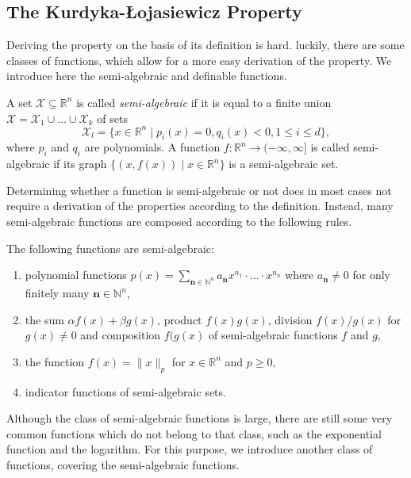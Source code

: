 \subsection{The Kurdyka-{\L}ojasiewicz Property}
Deriving the \KL property on the basis of its definition is hard. luckily, there are some classes of functions, which allow for a more easy derivation of the \KL property. We introduce here the semi-algebraic and definable functions. 
\begin{definition}
A set $\mathcal{X}\subseteq \mathbb{R}^n$ is called \emph{semi-algebraic} if it is equal to a finite union $\mathcal{X}=\mathcal{X}_1\cup\ldots\cup\mathcal{X}_k$ of sets
\[\mathcal{X}_l=\{x\in\mathbb{R}^n\mid p_i(x)=0, q_i(x)<0, 1\leq i\leq d\},\]
where $p_i$ and $q_i$ are polynomials.
A function $f:\mathbb{R}^n\rightarrow (-\infty,\infty]$ is called semi-algebraic if its graph $\{(x,f(x))\mid x\in\mathbb{R}^n\}$ is a semi-algebraic set.
\end{definition}
Determining whether a function is semi-algebraic or not does in most cases not require a derivation of the properties according to the definition. Instead, many semi-algebraic functions are composed according to the following rules.
\begin{example}
The following functions are semi-algebraic:
\begin{enumerate}
    \item polynomial functions $p(x)=\sum_{\mathbf{n}\in\mathbb{N}^n}a_\mathbf{n}x^{n_1}\cdot\ldots\cdot x^{n_n}$ where $a_\mathbf{n}\neq 0$ for only finitely many $\mathbf{n}\in\mathbb{N}^n$, 
    \item the sum $\alpha f(x)+\beta g(x)$, product $f(x)g(x)$, division $f(x)/g(x)$ for $g(x)\neq 0$ and composition $f(g(x)$ of semi-algebraic functions $f$ and $g$,
    \item the function $f(x)=\|x\|_p$ for $x\in\mathbb{R}^n$ and $p\geq 0$,
    \item indicator functions of semi-algebraic sets.
\end{enumerate}
\end{example}
Although the class of semi-algebraic functions is large, there are still some very common functions which do not belong to that class, such as the exponential function and the logarithm. For this purpose, we introduce another class of functions, covering the semi-algebraic functions.
